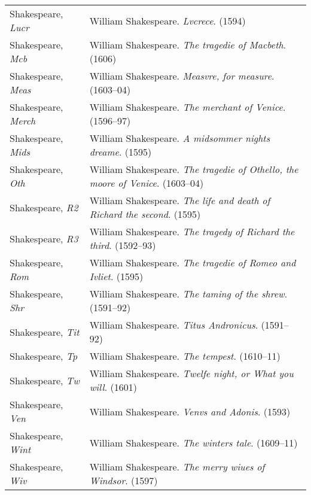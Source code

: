 \begin{longtable}{p{} p{}}
Shakespeare, \textit{Lucr} & William Shakespeare. \textit{Lvcrece}. (1594) \\ %
Shakespeare, \textit{Mcb} & William Shakespeare. \textit{The tragedie of Macbeth}. (1606) \\
Shakespeare, \textit{Meas} & William Shakespeare. \textit{Measvre, for measure}. (1603--04) \\ %
Shakespeare, \textit{Merch} & William Shakespeare. \textit{The merchant of Venice}. (1596--97) \\
Shakespeare, \textit{Mids} & William Shakespeare. \textit{A midsommer nights dreame}.  (1595) \\ %
Shakespeare, \textit{Oth} & William Shakespeare. \textit{The tragedie of Othello, the moore of Venice}. (1603--04) \\
Shakespeare, \textit{R2} & William Shakespeare. \textit{The life and death of Richard the second}. (1595) \\
Shakespeare, \textit{R3} & William Shakespeare. \textit{The tragedy of Richard the third}. (1592--93)  \\
Shakespeare, \textit{Rom} & William Shakespeare. \textit{The tragedie of Romeo and Ivliet}.  (1595) \\
Shakespeare, \textit{Shr} & William Shakespeare. \textit{The taming of the shrew}. (1591--92) \\
Shakespeare, \textit{Tit} & William Shakespeare. \textit{Titus Andronicus}. (1591--92) \\
Shakespeare, \textit{Tp} & William Shakespeare. \textit{The tempest}. (1610--11) \\
Shakespeare, \textit{Tw} & William Shakespeare. \textit{Twelfe night, or What you will}. (1601) \\
Shakespeare, \textit{Ven} & William Shakespeare. \textit{Venvs and Adonis}. (1593) \\
Shakespeare, \textit{Wint} & William Shakespeare. \textit{The winters tale}. (1609--11) \\
Shakespeare, \textit{Wiv} & William Shakespeare. \textit{The merry wiues of Windsor}. (1597) \\


\end{longtable}
